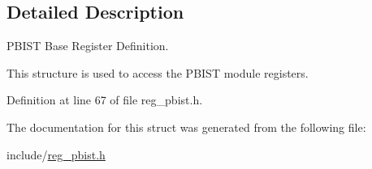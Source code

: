 \subsection{Detailed Description}
P\+B\+I\+ST Base Register Definition. 

This structure is used to access the P\+B\+I\+ST module registers. 

Definition at line 67 of file reg\+\_\+pbist.\+h.



The documentation for this struct was generated from the following file\+:\begin{DoxyCompactItemize}
\item 
include/\mbox{\hyperlink{reg__pbist_8h}{reg\+\_\+pbist.\+h}}\end{DoxyCompactItemize}
